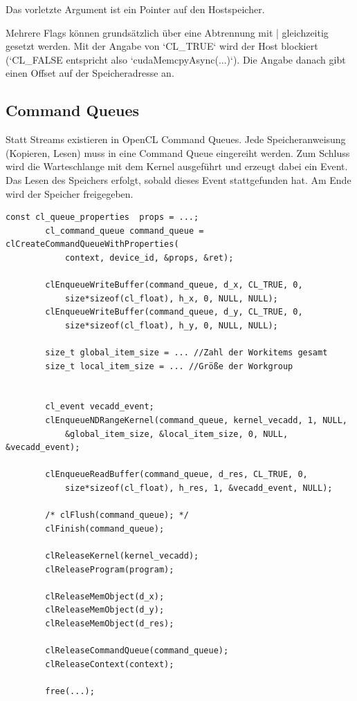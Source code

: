 			Das vorletzte Argument ist ein Pointer auf den Hostspeicher.
			
			Mehrere Flags können grundsätzlich über eine Abtrennung mit | gleichzeitig gesetzt werden. Mit der Angabe von \li`CL_TRUE` wird der Host blockiert (\li`CL_FALSE entspricht also \li`cudaMemcpyAsync(...)`). Die Angabe danach gibt einen Offset auf der Speicheradresse an.
							
			\subsection{Command Queues}
			Statt \Glspl{Stream} existieren in OpenCL \Glspl{Command Queue}. Jede Speicheranweisung (Kopieren, Lesen) muss in eine \Gls{Command Queue} eingereiht werden. Zum Schluss wird die Warteschlange mit dem \Gls{Kernel} ausgeführt und erzeugt dabei ein Event. Das Lesen des Speichers erfolgt, sobald dieses Event stattgefunden hat. Am Ende wird der Speicher freigegeben.
			
            \begin{lstlisting}[caption=Command Queues und Clean-Up]
        const cl_queue_properties  props = ...; 
        cl_command_queue command_queue = clCreateCommandQueueWithProperties(
            context, device_id, &props, &ret);

        clEnqueueWriteBuffer(command_queue, d_x, CL_TRUE, 0, 
            size*sizeof(cl_float), h_x, 0, NULL, NULL);	
        clEnqueueWriteBuffer(command_queue, d_y, CL_TRUE, 0,
            size*sizeof(cl_float), h_y, 0, NULL, NULL);			
				
        size_t global_item_size = ... //Zahl der Workitems gesamt
        size_t local_item_size = ... //Größe der Workgroup
        
        
        cl_event vecadd_event;
        clEnqueueNDRangeKernel(command_queue, kernel_vecadd, 1, NULL, 
            &global_item_size, &local_item_size, 0, NULL, &vecadd_event);
		
        clEnqueueReadBuffer(command_queue, d_res, CL_TRUE, 0, 
            size*sizeof(cl_float), h_res, 1, &vecadd_event, NULL);  
			
        /* clFlush(command_queue); */
        clFinish(command_queue);
		
        clReleaseKernel(kernel_vecadd);
        clReleaseProgram(program);
  
        clReleaseMemObject(d_x);
        clReleaseMemObject(d_y);
        clReleaseMemObject(d_res);

        clReleaseCommandQueue(command_queue);
        clReleaseContext(context);

        free(...);
            \end{lstlisting}
		
